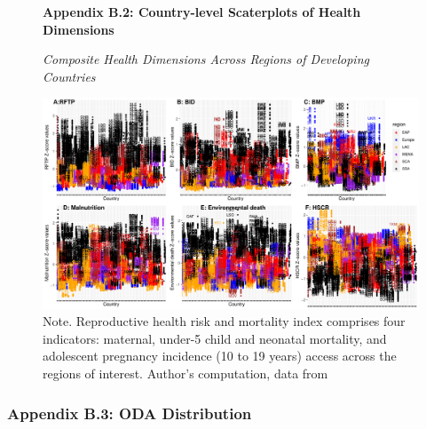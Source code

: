 \begin{landscape}
\begin{figure}[ht]
\textbf{Appendix B.2: Country-level Scaterplots of Health Dimensions}\\
\captionsetup{justification=justified,singlelinecheck=false}
\caption{\textit{Composite Health Dimensions Across Regions of Developing Countries}}
    \centering \includegraphics[width = 1.5\textwidth]{Figures/Health_Outcome_Graph/Combined_scatplot.pdf}
    \caption*{\footnotesize{Note. Reproductive health risk and mortality index comprises four indicators: maternal, under-5 child and neonatal mortality, and adolescent pregnancy incidence (10 to 19 years) access across the regions of interest. Author's computation, data from \textcite{unsdg_sustainable_2023, wdi_world_2023}}}
    \label{fig:combined_scat_plot}
\end{figure}
\end{landscape}

\subsubsection*{Appendix B.3: ODA Distribution}

